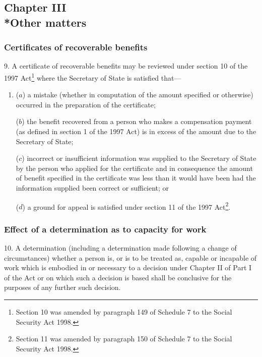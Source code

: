 \documentclass[12pt,a4paper]{article}
\begin{document}
\subsection[Chapter III --- Other matters]{Chapter III\\*Other matters}

\subsubsection[9. Certificates of recoverable benefits]{Certificates of recoverable benefits}

\renewcommand\parthead{--- Part II Chapter III}

9.  A certificate of recoverable benefits may be reviewed under section 10 of the 1997 Act\footnote{\frenchspacing Section 10 was amended by paragraph 149 of Schedule 7 to the Social Security Act 1998.} where the Secretary of State is satisfied that—
\begin{enumerate}\item[]
($a$) a mistake (whether in computation of the amount specified or otherwise) occurred in the preparation of the certificate;

($b$) the benefit recovered from a person who makes a compensation payment (as defined in section 1 of the 1997 Act) is in excess of the amount due to the Secretary of State;

($c$) incorrect or insufficient information was supplied to the Secretary of State by the person who applied for the certificate and in consequence the amount of benefit specified in the certificate was less than it would have been had the information supplied been correct or sufficient; or

($d$) a ground for appeal is satisfied under section 11 of the 1997 Act\footnote{\frenchspacing Section 11 was amended by paragraph 150 of Schedule 7 to the Social Security Act 1998.}.
\end{enumerate}

\subsubsection[10. Effect of a determination as to capacity for work]{Effect of a determination as to capacity for work}

10.  A determination (including a determination made following a change of circumstances) whether a person is, or is to be treated as, capable or incapable of work which is embodied in or necessary to a decision under Chapter II of Part I of the Act or on which such a decision is based shall be conclusive for the purposes of any further such decision.
\end{document}

